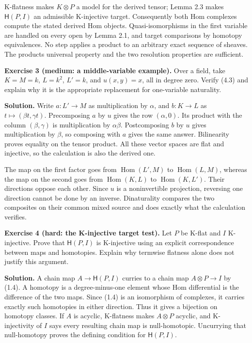 \documentclass[
  english,
  11pt,
  a4paper,
]{article}
\begin{document}
K-flatness makes \(K\otimes P\) a model for the derived tensor; Lemma
2.3 makes \(\mathsf H(P,I)\) an admissible K-injective target.
Consequently both Hom complexes compute the stated derived Hom objects.
Quasi-isomorphisms in the first variable are handled on every open by
Lemma 2.1, and target comparisons by homotopy equivalences. No step
applies a product to an arbitrary exact sequence of sheaves. The
product\textquotesingle s universal property and the two resolution
properties are sufficient.

\textbf{Exercise 3 (medium: a middle-variable example).} Over a field,
take \(K=M=k\), \(L=k^2\), \(L'=k\), and \(u(x,y)=x\), all in degree
zero. Verify (4.3) and explain why it is the appropriate replacement for
one-variable naturality.

\textbf{Solution.} Write \(a:L'\to M\) as multiplication by \(\alpha\),
and \(b:K\to L\) as \(t\mapsto(\beta t,\gamma t)\). Precomposing \(a\)
by \(u\) gives the row \((\alpha,0)\). Its product with the column
\((\beta,\gamma)\) is multiplication by \(\alpha\beta\). Postcomposing
\(b\) by \(u\) gives multiplication by \(\beta\), so composing with
\(a\) gives the same answer. Bilinearity proves equality on the tensor
product. All these vector spaces are flat and injective, so the
calculation is also the derived one.

The map on the first factor goes from \(\operatorname{Hom}(L',M)\) to
\(\operatorname{Hom}(L,M)\), whereas the map on the second goes from
\(\operatorname{Hom}(K,L)\) to \(\operatorname{Hom}(K,L')\). Their
directions oppose each other. Since \(u\) is a noninvertible projection,
reversing one direction cannot be done by an inverse. Dinaturality
compares the two composites on their common mixed source and does
exactly what the calculation verifies.

\textbf{Exercise 4 (hard: the K-injective target test).} Let \(P\) be
K-flat and \(I\) K-injective. Prove that \(\mathsf H(P,I)\) is
K-injective using an explicit correspondence between maps and
homotopies. Explain why termwise flatness alone does not justify this
argument.

\textbf{Solution.} A chain map \(A\to\mathsf H(P,I)\) curries to a chain
map \(A\otimes P\to I\) by (1.4). A homotopy is a degree-minus-one
element whose Hom differential is the difference of the two maps. Since
(1.4) is an isomorphism of complexes, it carries exactly such homotopies
in either direction. Thus it gives a bijection on homotopy classes. If
\(A\) is acyclic, K-flatness makes \(A\otimes P\) acyclic, and
K-injectivity of \(I\) says every resulting chain map is null-homotopic.
Uncurrying that null-homotopy proves the defining condition for
\(\mathsf H(P,I)\).
\end{document}
